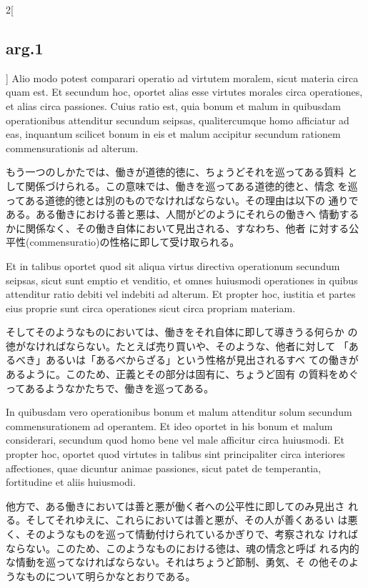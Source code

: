 \documentclass[paper=a4paper,fontsize=10pt,jafontsize=9pt,titlepage]{jlreq}
\begin{document}
\begin{paracol}{2}[\subsection{arg.1}]
Alio modo potest comparari operatio ad virtutem moralem, sicut
 materia circa quam est. Et secundum hoc, oportet alias esse virtutes
 morales circa operationes, et alias circa passiones. Cuius ratio est,
 quia bonum et malum in quibusdam operationibus attenditur secundum
 seipsas, qualitercumque homo afficiatur ad eas, inquantum scilicet
 bonum in eis et malum accipitur secundum rationem commensurationis ad
 alterum.

\switchcolumn

もう一つのしかたでは、働きが道徳的徳に、ちょうどそれを巡ってある質料
 として関係づけられる。この意味では、働きを巡ってある道徳的徳と、情念
 を巡ってある道徳的徳とは別のものでなければならない。その理由は以下の
 通りである。ある働きにおける善と悪は、人間がどのようにそれらの働きへ
 情動するかに関係なく、その働き自体において見出される、すなわち、他者
 に対する公平性(commensuratio)の性格に即して受け取られる。

\switchcolumn*

Et in talibus oportet quod sit aliqua virtus directiva operationum
 secundum seipsas, sicut sunt emptio et venditio, et omnes huiusmodi
 operationes in quibus attenditur ratio debiti vel indebiti ad
 alterum. Et propter hoc, iustitia et partes eius proprie sunt circa
 operationes sicut circa propriam materiam.

\switchcolumn

そしてそのようなものにおいては、働きをそれ自体に即して導きうる何らか
 の徳がなければならない。たとえば売り買いや、そのような、他者に対して
 「あるべき」あるいは「あるべからざる」という性格が見出されるすべ
 ての働きがあるように。このため、正義とその部分は固有に、ちょうど固有
 の質料をめぐってあるようなかたちで、働きを巡ってある。

\switchcolumn*

In quibusdam vero operationibus bonum et malum attenditur solum
 secundum commensurationem ad operantem. Et ideo oportet in his bonum
 et malum considerari, secundum quod homo bene vel male afficitur
 circa huiusmodi. Et propter hoc, oportet quod virtutes in talibus
 sint principaliter circa interiores affectiones, quae dicuntur animae
 passiones, sicut patet de temperantia, fortitudine et aliis
 huiusmodi.

\switchcolumn

他方で、ある働きにおいては善と悪が働く者への公平性に即してのみ見出さ
 れる。そしてそれゆえに、これらにおいては善と悪が、その人が善くあるい
 は悪く、そのようなものを巡って情動付けられているかぎりで、考察されな
 ければならない。このため、このようなものにおける徳は、魂の情念と呼ば
 れる内的な情動を巡ってなければならない。それはちょうど節制、勇気、そ
 の他そのようなものについて明らかなとおりである。


\end{paracol}
\end{document}
